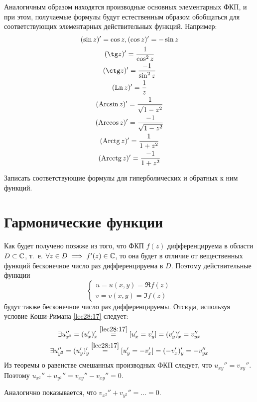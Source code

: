 \documentclass[../../main.tex]{subfiles}
\begin{document}
Аналогичным образом находятся производные основных элементарных ФКП, 
и при этом, получаемые формулы будут естественным образом обобщаться для
соответствующих элементарных действительных функций. Например:
\[
\begin{gathered}
(\sin z)' = \cos z, (\cos z)' = -\sin z\\
(\tg z)' = \dfrac{1}{\cos^2 z}\\ 
(\ctg z)' = \dfrac{-1}{\sin^2 z}\\
(\Ln z)' = \dfrac{1}{z}\\
(\Arcsin z)' = \dfrac{1}{\sqrt{1 - z^2}}\\
(\Arccos z)' = \dfrac{-1}{\sqrt{1 - z^2}}\\
(\Arctg z)' = \dfrac{1}{1 + z^2}\\
(\Arcctg z)' = \dfrac{-1}{1 + z^2}
\end{gathered}
\]
\begin{exc}
	Записать соответствующие формулы для гиперболических 
	и обратных к ним функций.
\end{exc}

\section{Гармонические функции}

Как будет получено позжже из того, что ФКП $ f(z) $ дифференцируема в области
$ D \subset \mathbb{C} $, т.~е. $ \forall z \in D \implies f'(z) \in \mathbb{C} $, то она 
будет
в отличие от вещественных функций бесконечное число раз дифференцируема в $ D 
$.
Поэтому действительные функции 
\[
\begin{cases}
	u = u(x, y) = \Re f(z)\\
	v = v(x, y) = \Im f(z)
\end{cases}
\]
будут также бесконечное число раз дифференцируемы. Отсюда, используя условие
Коши-Римана \eqref{lec28:17} следует:
\[
\begin{gathered}
\exists u_{x^2}'' = (u_x')_x' 
\stackrel{\eqref{lec28:17}}{=}
[u_x' = v_y'] = (v_y')_x' = v_{yx}''\\
\exists u_{y^2}'' = (u_y')_y' 
\stackrel{\eqref{lec28:17}}{=}
[u_y' = -v_x'] = (-v_x')_y' = -v_{yx}''\\
\end{gathered}
\]
Из теоремы о равенстве смешанных производных ФКП следует, что 
$ u_{xy}'' = v_{xy}'' $. Поэтому $ u_{x^2}'' + u_{y^2}'' = v_{xy}'' - v_{xy}'' 
= 0 $.

Аналогично показывается, что $ v_{x^2}'' + v_{y^2}'' = \dots = 0 $.
\end{document}
